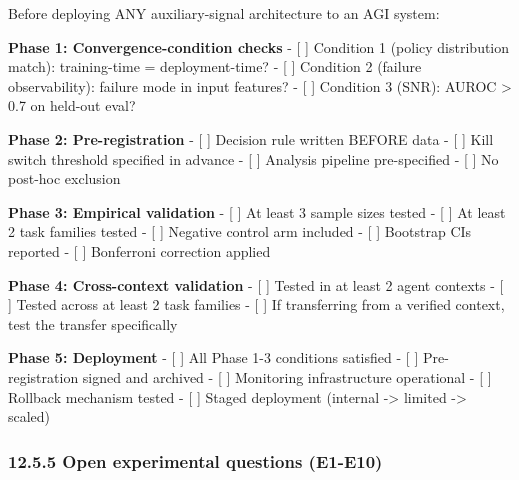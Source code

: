 \documentclass[11pt]{article}
\begin{document}
Before deploying ANY auxiliary-signal architecture to an AGI system:

\textbf{Phase 1: Convergence-condition checks} - {[} {]} Condition 1
(policy distribution match): training-time = deployment-time? - {[} {]}
Condition 2 (failure observability): failure mode in input features? -
{[} {]} Condition 3 (SNR): AUROC \textgreater{} 0.7 on held-out eval?

\textbf{Phase 2: Pre-registration} - {[} {]} Decision rule written
BEFORE data - {[} {]} Kill switch threshold specified in advance - {[}
{]} Analysis pipeline pre-specified - {[} {]} No post-hoc exclusion

\textbf{Phase 3: Empirical validation} - {[} {]} At least 3 sample sizes
tested - {[} {]} At least 2 task families tested - {[} {]} Negative
control arm included - {[} {]} Bootstrap CIs reported - {[} {]}
Bonferroni correction applied

\textbf{Phase 4: Cross-context validation} - {[} {]} Tested in at least
2 agent contexts - {[} {]} Tested across at least 2 task families - {[}
{]} If transferring from a verified context, test the transfer
specifically

\textbf{Phase 5: Deployment} - {[} {]} All Phase 1-3 conditions
satisfied - {[} {]} Pre-registration signed and archived - {[} {]}
Monitoring infrastructure operational - {[} {]} Rollback mechanism
tested - {[} {]} Staged deployment (internal -\textgreater{} limited
-\textgreater{} scaled)

\subsubsection{12.5.5 Open experimental questions
(E1-E10)}\label{open-experimental-questions-e1-e10}
\end{document}
